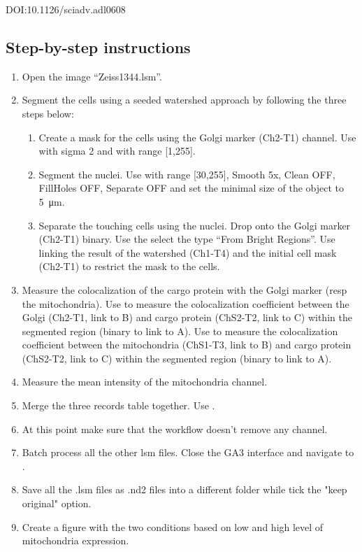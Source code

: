 DOI:10.1126/sciadv.adl0608

\subsection{Step-by-step instructions}
\begin{enumerate}
    \item Open the image ``Zeiss1344.lsm''.
    \item Segment the cells using a seeded watershed approach by following the three steps below:
    \begin{enumerate}
        \item Create a mask for the cells using the Golgi marker (Ch2-T1) channel. \soln Use  with sigma 2 and  with range [1,255]. \solnend
        \item Segment the nuclei. \soln Use  with range [30,255], Smooth 5x, Clean OFF, FillHoles OFF, Separate OFF and set the minimal size of the object to \SI{5}{\micro\meter}. \solnend
        \item Separate the touching cells using the nuclei. Drop  onto the Golgi marker (Ch2-T1) binary. Use the  select the type ``From Bright Regions''. Use  linking the result of the watershed (Ch1-T4) and the initial cell mask (Ch2-T1) to restrict the mask to the cells.
    \end{enumerate}
    \item Measure the colocalization of the cargo protein with the Golgi marker (resp the mitochondria). Use  to measure the colocalization coefficient between the Golgi (Ch2-T1, link to B) and cargo protein (ChS2-T2, link to C) within the segmented region (binary to link to A). Use  to measure the colocalization coefficient between the mitochondria (ChS1-T3, link to B) and cargo protein (ChS2-T2, link to C) within the segmented region (binary to link to A).
    \item Measure the mean intensity of the mitochondria channel.
    \item Merge the three records table together. \soln Use . \solnend
    \item At this point make sure that the workflow doesn’t remove any channel.
    \item Batch process all the other lsm files. Close the GA3 interface and navigate to .
    \item Save all the .lsm files as .nd2 files into a different folder while tick the "keep original" option.
    \item Create a figure with the two conditions based on low and high level of mitochondria expression.
\end{enumerate}
